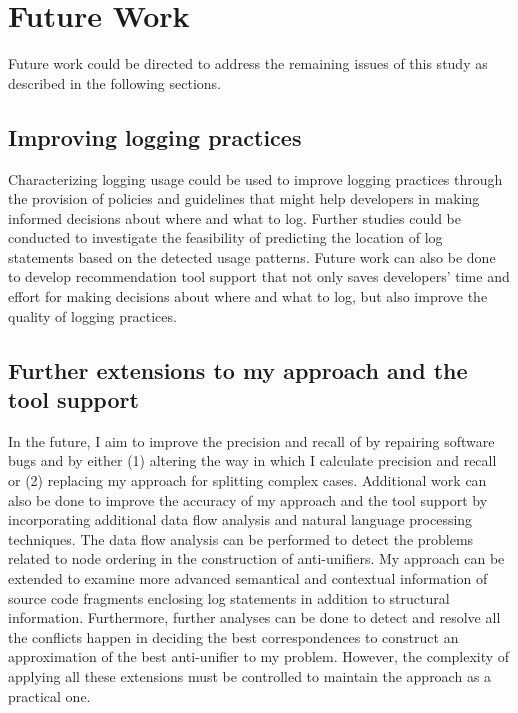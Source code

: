 \section{Future Work}  \label{fw}
Future work could be directed to address the remaining issues of this study as described in the following sections.


\subsection{Improving logging practices}
Characterizing logging usage could be used to improve logging practices through the provision of policies and guidelines that might help developers in making informed decisions about where and what to log. Further studies could be conducted to investigate the feasibility of predicting the location of log statements based on the detected usage patterns. Future work can also be done to develop recommendation tool support that not only saves developers' time and effort for making decisions about where and what to log, but also improve the quality of logging practices.
\subsection{Further extensions to my approach and the tool support}
In the future, I aim to improve the precision and recall of  by repairing software bugs and by either (1) altering the way in which I calculate precision and recall or (2) replacing my approach for splitting complex cases. Additional work can also be done to improve the accuracy of my approach and the tool support by incorporating additional data flow analysis and natural language processing techniques. The data flow analysis can be performed to detect the problems related to node ordering in the  construction of anti-unifiers. My approach can be extended to examine more advanced semantical and contextual information of source code fragments enclosing log statements in addition to structural information. Furthermore, further analyses can be done to detect and resolve all the conflicts happen in deciding the best correspondences to construct an approximation of the best anti-unifier to my problem. However, the complexity of applying all these extensions must be controlled to maintain the approach as a practical one.

